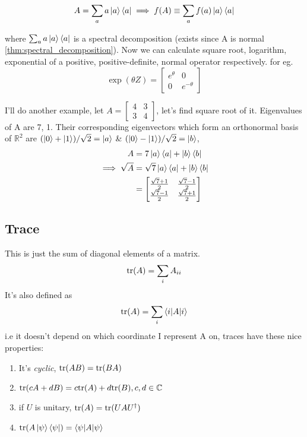 \begin{equation}
    A = \sum_a a\ket{a}\bra{a} \implies
    f(A) \equiv \sum_a f(a)\ket{a}\bra{a}
\end{equation}

where $\sum_a a\ket{a}\bra{a}$ is a spectral decomposition (exists since A is normal \ref{thm:spectral_decomposition}). Now we can calculate square root, logarithm, exponential of a positive, positive-definite, normal operator respectively.
for eg.
\begin{equation}
    \exp{(\theta Z)} =
    \begin{bmatrix}
        e^\theta  & 0 \\
        0 & e^{-\theta}
    \end{bmatrix}
\end{equation}

I'll do another example, let $A = \begin{bmatrix}
    4 & 3 \\ 3 & 4
\end{bmatrix}$, let's find square root of it.
Eigenvalues of A are 7, 1. Their corresponding eigenvectors which form an orthonormal basis of $\mathbb{R}^2$ are $(\ket{0} + \ket{1})/\sqrt{2} = \ket{a}$ \& $(\ket{0}-\ket{1})/\sqrt{2} = \ket{b}$,
\begin{align}
    A &= 7\ket{a}\bra{a} + \ket{b}\bra{b} \\
    \implies \sqrt{A} &= \sqrt{7}\ket{a}\bra{a} + \ket{b}\bra{b} \\
    &= \begin{bmatrix}
        \frac{\sqrt{7} + 1}{2} & \frac{\sqrt{7}-1}{2}\\
        \frac{\sqrt{7}-1}{2} & \frac{\sqrt{7} + 1}{2} 
    \end{bmatrix}
\end{align}

\subsection{Trace}
This is just the sum of diagonal elements of a matrix. 
\begin{equation}
    \text{tr}(A) = \sum_i A_{ii}
\end{equation}
It's also defined as
\begin{equation}
    \text{tr}(A) = \sum_i \braket{i|A|i}
\end{equation}
i.e it doesn't depend on which coordinate I represent A on, traces have these nice properties:
\begin{enumerate}
    \item It's \textit{cyclic}, $\text{tr}(AB) = \text{tr}(BA)$
    \item $\text{tr}(cA + dB) = c\text{tr}(A) + d\text{tr}(B), c,d \in \mathbb{C}$
    \item if $U$ is unitary, $\text{tr}(A) = \text{tr}(UAU^{\dag})$   
    \item $\text{tr}(A\ket{\psi}\bra{\psi}) = \braket{\psi|A|\psi}$
\end{enumerate}

